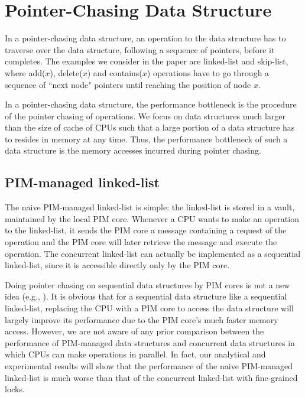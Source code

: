 
\section{Pointer-Chasing Data Structure}
\label{section:pointer_chasing}
In a pointer-chasing data structure, an operation to the data structure has to 
traverse over the data structure, following a sequence of pointers, before it completes.
The examples we consider in the paper are linked-list and skip-list,
where add($x$), delete($x$) and contains($x$) operations have to go through
a sequence of ``next node" pointers until reaching the position of node $x$.

In a pointer-chasing data structure,
the performance bottleneck is the procedure of the pointer chasing of operations.
We focus on data structures much larger than the size of cache of CPUs
such that a large portion of a data structure has to resides in memory at any time.
Thus, the performance bottleneck of such a data structure is
the memory accesses incurred during pointer chasing.


\subsection{PIM-managed linked-list}
\label{section:linked_list}
The naive PIM-managed linked-list is simple:
the linked-list is stored in a vault, maintained by the local PIM core.
Whenever a CPU wants to make an operation to the linked-list,
it sends the PIM core a message containing a request of the operation
and the PIM core will later retrieve the message and execute the operation.
The concurrent linked-list can actually be implemented
as a sequential linked-list, since it is accessible directly only by the PIM core.

Doing pointer chasing on sequential data structures by PIM cores is not a new idea
(e.g., \cite{hsieh2016accelerating, Ahn2015:2}).
It is obvious that for a sequential data structure like a sequential linked-list,
replacing the CPU with a PIM core to access the data structure will largely improve
its performance due to the PIM core's much faster memory access.
However, we are not aware of any prior comparison between the performance of
PIM-managed data structures and concurrent data structures
in which CPUs can make operations in parallel.
In fact, our analytical and experimental results will show that
the performance of the naive PIM-managed linked-list is much worse than
that of the concurrent linked-list with fine-grained locks\cite{Heller05}.

